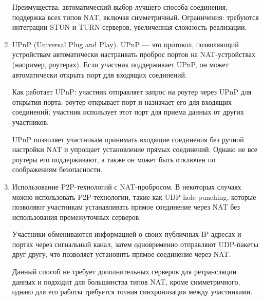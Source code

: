 \begin{enumerate}
  Преимущества: автоматический выбор лучшего способа соединения, поддержка всех типов NAT, включая симметричный.
  Ограничения: требуются интеграции STUN и TURN серверов, увеличенная сложность реализации.

  \item UPnP (Universal Plug and Play).
  UPnP --- это протокол, позволяющий устройствам автоматически настраивать проброс портов на NAT-устройствах (например, роутерах).
  Если участник поддерживает UPnP, он может автоматически открыть порт для входящих соединений.

  Как работает UPnP: участник отправляет запрос на роутер через UPnP для открытия порта; роутер открывает порт и назначает его для входящих соединений; участник использует этот порт для приема данных от других участников.

  UPnP позволяет участникам принимать входящие соединения без ручной настройки NAT и  упрощает установление прямых соединений.
  Однако не все роутеры его поддерживают, а также он может быть отключен по соображениям безопасности.

  \item Использование P2P-технологий с NAT-пробросом.
  В некоторых случаях можно использовать P2P-технологии, такие как UDP hole punching, которые позволяют участникам устанавливать прямое соединение через NAT без использования промежуточных серверов.

  Участники обмениваются информацией о своих публичных IP-адресах и портах через сигнальный канал, затем одновременно отправляют UDP-пакеты друг другу, что позволяет установить прямое соединение через NAT.

  Данный способ не требует дополнительных серверов для ретрансляции данных и подходит для большинства типов NAT, кроме симметричного, однако для его работы требуется точная синхронизация между участниками.
\end{enumerate}
